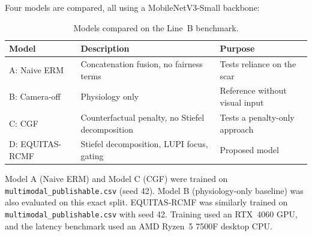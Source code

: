 Four models are compared, all using a MobileNetV3-Small backbone:
\begin{table}[htbp]
\centering
\begin{tabular}{@{}lll@{}}
\toprule
\textbf{Model} & \textbf{Description} & \textbf{Purpose} \\
\midrule
A: Naive ERM & Concatenation fusion, no fairness terms & Tests reliance on the scar \\
B: Camera-off & Physiology only & Reference without visual input \\
C: CGF & Counterfactual penalty, no Stiefel decomposition & Tests a penalty-only approach \\
D: EQUITAS-RCMF & Stiefel decomposition, LUPI focus, gating & Proposed model \\
\bottomrule
\end{tabular}
\caption{Models compared on the Line~B benchmark.}
\label{tab:ablation_models}
\end{table}
Model A (Naive ERM) and Model C (CGF) were trained on \texttt{multimodal\_publishable.csv} (seed 42). Model B (physiology-only baseline) was also evaluated on this exact split. EQUITAS-RCMF was similarly trained on \texttt{multimodal\_publishable.csv} with seed 42.
Training used an RTX~4060 GPU, and the latency benchmark used an AMD Ryzen~5 7500F desktop CPU.
